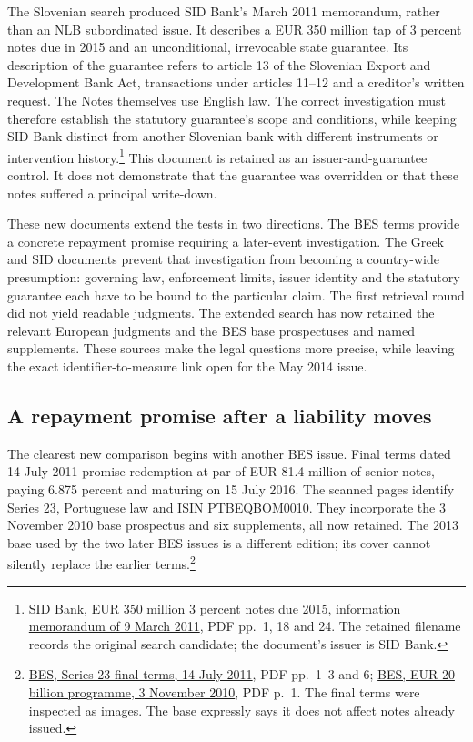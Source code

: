 The Slovenian search produced SID Bank's March 2011 memorandum, rather than
an NLB subordinated issue. It describes a EUR 350 million tap of 3 percent
notes due in 2015 and an unconditional, irrevocable state guarantee. Its
description of the guarantee refers to article 13 of the Slovenian Export
and Development Bank Act, transactions under articles 11--12 and a creditor's
written request. The Notes themselves use English law. The correct
investigation must therefore establish the statutory guarantee's scope and
conditions, while keeping SID Bank distinct from another Slovenian bank
with different instruments or intervention history.\footnote{
\href{../prospectus/jurisdiction-2026-10-04/sources/jur-nlb-2011-candidate/source.pdf}
{SID Bank, EUR 350 million 3 percent notes due 2015, information memorandum
of 9 March 2011}, PDF pp.~1, 18 and 24. The retained filename records the
original search candidate; the document's issuer is SID Bank.}
This document is retained as an issuer-and-guarantee control. It does not
demonstrate that the guarantee was overridden or that these notes suffered
a principal write-down.

These new documents extend the tests in two directions. The BES terms
provide a concrete repayment promise requiring a later-event investigation.
The Greek and SID documents prevent that investigation from becoming a
country-wide presumption: governing law, enforcement limits, issuer identity
and the statutory guarantee each have to be bound to the particular claim.
The first retrieval round did not yield readable judgments. The extended
search has now retained the relevant European judgments and the BES base
prospectuses and named supplements. These sources make the legal questions
more precise, while leaving the exact identifier-to-measure link open for
the May 2014 issue.


\subsection{A repayment promise after a liability moves}

The clearest new comparison begins with another BES issue. Final terms dated
14 July 2011 promise redemption at par of EUR 81.4 million of senior notes,
paying 6.875 percent and maturing on 15 July 2016. The scanned pages identify
Series 23, Portuguese law and ISIN PTBEQBOM0010. They incorporate the
3 November 2010 base prospectus and six supplements, all now retained.
The 2013 base used by the two later BES issues is a different edition;
its cover cannot silently replace the earlier terms.\footnote{
\href{../prospectus/corner-cases-2026-10-04/sources/jur-more-bes-1315263/source.pdf}
{BES, Series 23 final terms, 14 July 2011}, PDF pp.~1--3 and 6;
\href{../prospectus/corner-cases-2026-10-04/sources/jur-more-bes-1217215/source.pdf}
{BES, EUR 20 billion programme, 3 November 2010}, PDF p.~1.
The final terms were inspected as images. The base expressly says it does
not affect notes already issued.}

